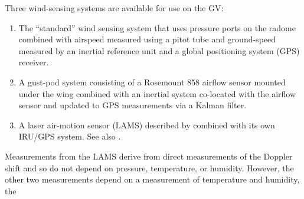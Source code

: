 \documentclass[12pt,twoside,english]{article}\usepackage[]{graphicx}\usepackage[]{color}
\let\OrgIndex\index
\renewcommand*{\index}[1]{\OrgIndex{#1}}
\begin{document}
Three wind-sensing systems are available for use on the GV:  
\begin{enumerate}
\item The ``standard'' wind sensing system that uses pressure ports on the radome combined with airspeed measured using a pitot tube and ground-speed measured by an inertial reference unit and a global positioning system (GPS) receiver.  
\item A gust-pod system consisting of a Rosemount 858 airflow sensor mounted under the wing combined with an inertial system co-located with the airflow sensor and updated to GPS measurements via a Kalman filter.  
\item A laser air-motion sensor (LAMS) described by \citet{SpulerEtAl2011}
combined with its own IRU/GPS system. See also \citet{CooperEtAl2014}.  
\end{enumerate}
Measurements from the LAMS derive from direct measurements of the Doppler shift
and so do not depend on pressure, temperature, or humidity. However, the other
two measurements depend on a measurement of temperature and humidity, the
\end{document}
